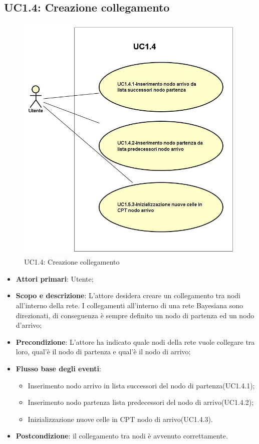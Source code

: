 \subsection{UC1.4: Creazione collegamento} 
\hypertarget{UC1.4}{} 
\begin{figure} [H]
	\centering
	\includegraphics[scale=0.45]{Img/UC1-4} 
	\caption{UC1.4: Creazione collegamento} \label{} 
\end{figure} 
\begin{itemize} 
	\item{\textbf{Attori primari}: Utente;} 
	\item{\textbf{Scopo e descrizione}: L'attore desidera creare un collegamento tra nodi all'interno della rete. I collegamenti all'interno di una rete Bayesiana sono direzionati, di conseguenza è sempre definito un nodo di partenza ed un nodo d'arrivo;} 
	\item{\textbf{Precondizione}: L'attore ha indicato quale nodi della rete vuole collegare tra loro, qual'è il nodo di partenza e qual'è il nodo di arrivo;} 
	\item{\textbf{Flusso base degli eventi}: } 
	\begin{itemize} 
		\item{Inserimento nodo arrivo in lista successori del nodo di partenza(UC1.4.1);} 
		\item{Inserimento nodo partenza lista predecessori del nodo di arrivo(UC1.4.2);} 
		\item{Inizializzazione nuove celle in CPT nodo di arrivo(UC1.4.3).} 
	\end{itemize} 
	\item{\textbf{Postcondizione}: il collegamento tra nodi è avvenuto correttamente.} 
\end{itemize} 
